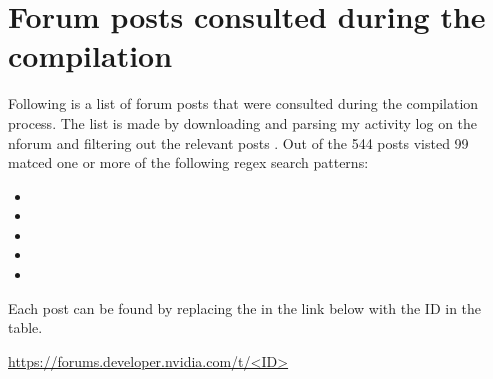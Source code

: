 \chapter{Forum posts consulted during the compilation}

Following is a list of forum posts that were consulted during the compilation process.
The list is made by downloading and parsing my activity log on the \gls{nforum} and filtering out the relevant posts \cite{martensPostsRedEmil}.
Out of the 544 posts visted 99 matced one or more of the following regex search patterns:
\begin{itemize}
    \item {}
    \item {}
    \item {}
    \item {}
    \item {}
\end{itemize}
Each post can be found by replacing the  in the link below with the ID in the table.

\url{https://forums.developer.nvidia.com/t/<ID>}


